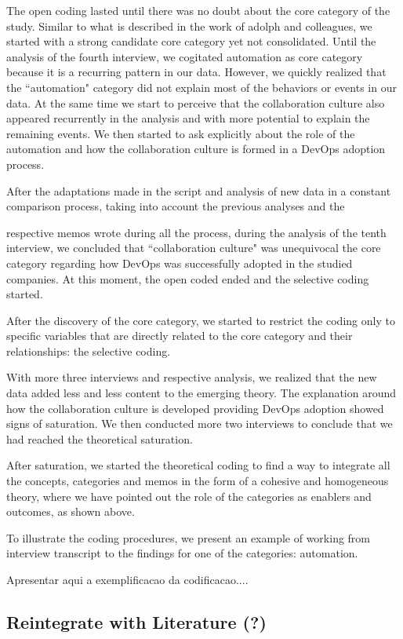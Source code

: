 The open coding lasted until there was no doubt about the core category of the
study. Similar to what is described in the work of adolph and colleagues\cite{adolph2012reconciling}, we  started with a strong candidate core category yet not consolidated. Until
the analysis of the fourth interview, we cogitated automation as core
category because it is a recurring pattern in our data. However, we quickly
realized that the ``automation" category did not explain most of the behaviors
or events in our data. At the same time we start to perceive that the
collaboration culture also appeared recurrently in the analysis and with more
potential to explain the remaining events. We then started to ask explicitly
about the role of the automation and how the collaboration culture is formed
in a DevOps adoption process.

After the adaptations made in the script and analysis of new data in a constant
comparison process, taking into account the previous analyses and the

respective memos wrote during all the process, during the analysis of the tenth
interview, we concluded that ``collaboration culture" was unequivocal the core
category regarding how DevOps was
successfully adopted in the studied companies. At this moment, the open coded ended and the selective coding started.

After the discovery of the core category, we started to restrict the coding only
to specific variables that are directly related to the core category and their
relationships: the selective coding.

With more three interviews and respective analysis, we realized that
the new data added less and less content to the emerging theory. The
explanation around how the collaboration culture is developed providing
DevOps adoption showed signs of saturation. We then conducted more two
interviews to conclude that we had reached the theoretical saturation.

After saturation, we started the theoretical coding to find a way to integrate
all the concepts, categories and memos in the form of a cohesive and
homogeneous theory, where we have pointed out the role of the categories as
enablers and outcomes, as shown above.

To illustrate the coding procedures, we present an example of working from
interview transcript to the findings for one of the categories: automation.


Apresentar aqui a exemplificacao da codificacao....

\subsection{Reintegrate with Literature (?)}

